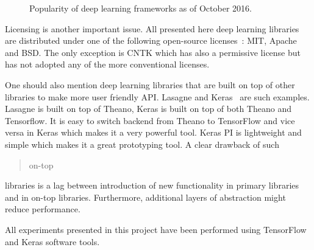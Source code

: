 \documentclass[a4paper, 11pt, table]{article}
\begin{document}
\begin{figure}[H]
\centering


\caption{\label{fig:framework_popularity}Popularity of deep learning frameworks as of October 2016.}
\end{figure}

Licensing is another important issue. All presented here deep learning libraries are distributed under one of the following open-source licenses~\cite{Rosen:2004:OSL:1014911}: MIT, Apache and BSD. The only exception is CNTK which has also a permissive license but has not adopted any of the more conventional licenses.

One should also mention deep learning libraries that are built on top of other libraries to make more user friendly API. Lasagne and Keras~\cite{chollet2015keras} are such examples. Lasagne is built on top of Theano, Keras is built on top of both Theano and Tensorflow. It is easy to switch backend from Theano to TensorFlow and vice versa in Keras which makes it a very powerful tool. Keras PI is lightweight and simple which makes it a great prototyping tool. A clear drawback of such \blockquote{on-top} libraries is a lag between introduction of new functionality in primary libraries and in on-top libraries. Furthermore, additional layers of abstraction might reduce performance. 

All experiments presented in this project have been performed using TensorFlow and Keras software tools. 
\end{document}
